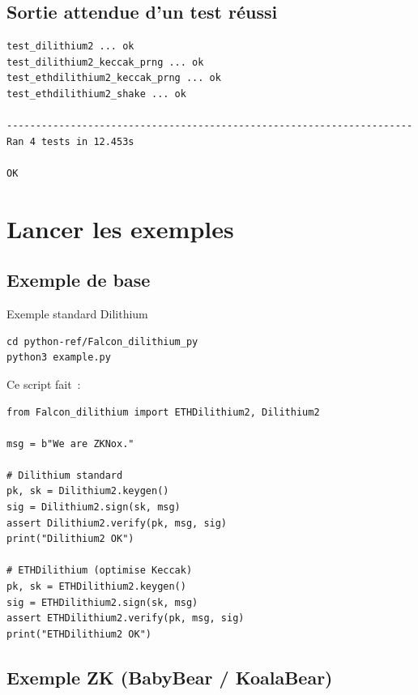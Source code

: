 \documentclass[12pt, a4paper]{article}
\begin{document}
\subsection{Sortie attendue d'un test réussi}

\begin{successbox}
\begin{lstlisting}[style=output]
test_dilithium2 ... ok
test_dilithium2_keccak_prng ... ok
test_ethdilithium2_keccak_prng ... ok
test_ethdilithium2_shake ... ok

----------------------------------------------------------------------
Ran 4 tests in 12.453s

OK
\end{lstlisting}
\end{successbox}

\section{Lancer les exemples}

\subsection{Exemple de base}

\begin{cmdbox}{Exemple standard Dilithium}
\begin{lstlisting}[style=bash]
cd python-ref/Falcon_dilithium_py
python3 example.py
\end{lstlisting}
\end{cmdbox}

Ce script fait~:
\begin{lstlisting}[style=python]
from Falcon_dilithium import ETHDilithium2, Dilithium2

msg = b"We are ZKNox."

# Dilithium standard
pk, sk = Dilithium2.keygen()
sig = Dilithium2.sign(sk, msg)
assert Dilithium2.verify(pk, msg, sig)
print("Dilithium2 OK")

# ETHDilithium (optimise Keccak)
pk, sk = ETHDilithium2.keygen()
sig = ETHDilithium2.sign(sk, msg)
assert ETHDilithium2.verify(pk, msg, sig)
print("ETHDilithium2 OK")
\end{lstlisting}

\subsection{Exemple ZK (BabyBear / KoalaBear)}
\end{document}
